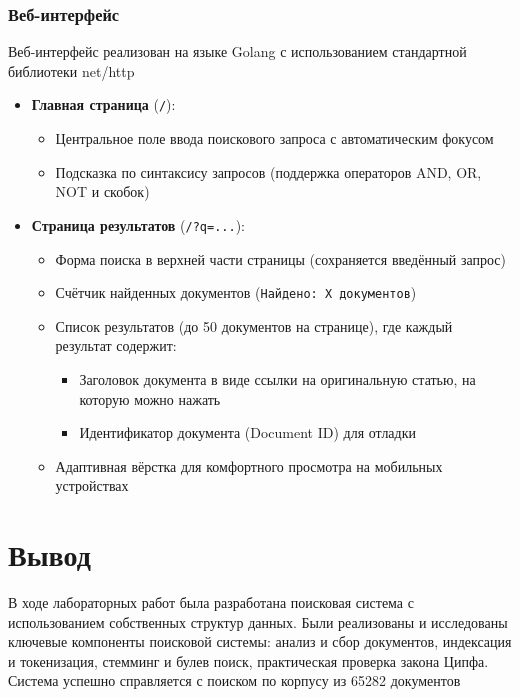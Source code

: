 \documentclass[a4paper,12pt]{article}
\begin{document}
\subsubsection{Веб-интерфейс}
Веб-интерфейс реализован на языке Golang с использованием стандартной библиотеки net/http
\begin{itemize}
    \item \textbf{Главная страница} (\texttt{/}):
    \begin{itemize}
        \item Центральное поле ввода поискового запроса с автоматическим фокусом
        \item Подсказка по синтаксису запросов (поддержка операторов AND, OR, NOT и скобок)
    \end{itemize}

    \item \textbf{Страница результатов} (\texttt{/?q=...}):
    \begin{itemize}
        \item Форма поиска в верхней части страницы (сохраняется введённый запрос)
        \item Счётчик найденных документов (\texttt{Найдено: X документов})
        \item Список результатов (до 50 документов на странице), где каждый результат содержит:
        \begin{itemize}
            \item Заголовок документа в виде ссылки на оригинальную статью, на которую можно нажать
            \item Идентификатор документа (Document ID) для отладки
        \end{itemize}
        \item Адаптивная вёрстка для комфортного просмотра на мобильных устройствах
    \end{itemize}
\end{itemize}



\newpage
\section{Вывод}
В ходе лабораторных работ была разработана поисковая система с использованием собственных структур данных. Были реализованы и исследованы ключевые компоненты поисковой системы: анализ и сбор документов, индексация и токенизация, стемминг и булев поиск, практическая проверка закона Ципфа. Система успешно справляется с поиском по корпусу из 65282 документов
\end{document}
